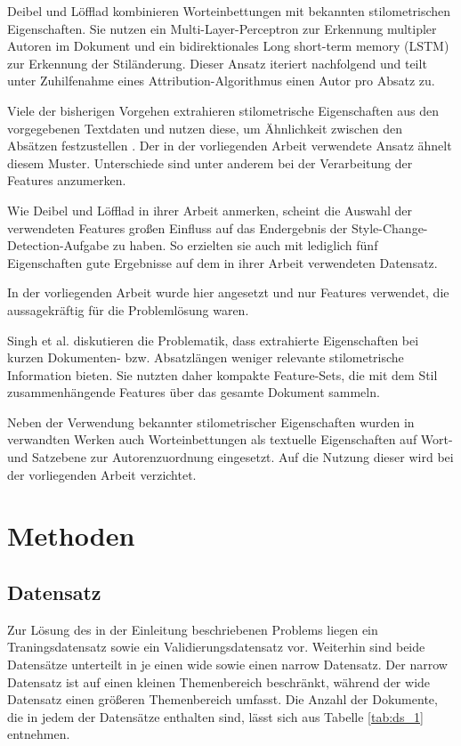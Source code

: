 \documentclass[conference]{IEEEtran}
\begin{document}
Deibel und Löfflad \cite{vw_b4} kombinieren Worteinbettungen mit bekannten stilometrischen Eigenschaften. Sie nutzen ein Multi-Layer-Perceptron zur Erkennung multipler Autoren im Dokument und ein bidirektionales Long short-term memory (LSTM) zur Erkennung der Stiländerung. Dieser Ansatz iteriert nachfolgend und teilt unter Zuhilfenahme eines Attribution-Algorithmus einen Autor pro Absatz zu.

Viele der bisherigen Vorgehen extrahieren stilometrische Eigenschaften aus den vorgegebenen Textdaten und nutzen diese, um Ähnlichkeit zwischen den Absätzen festzustellen \cite{vw_b5,vw_b6,vw_b7}. Der in der vorliegenden Arbeit verwendete Ansatz ähnelt diesem Muster. Unterschiede sind unter anderem bei der Verarbeitung der Features anzumerken. 

Wie Deibel und Löfflad \cite{vw_b4} in ihrer Arbeit anmerken, scheint die Auswahl der verwendeten Features großen Einfluss auf das Endergebnis der Style-Change-Detection-Aufgabe zu haben. So erzielten sie auch mit lediglich fünf Eigenschaften gute Ergebnisse auf dem in ihrer Arbeit verwendeten Datensatz.  

In der vorliegenden Arbeit wurde hier angesetzt und nur Features verwendet, die aussagekräftig für die Problemlösung waren. 

Singh et al. \cite{vw_b8} diskutieren die Problematik, dass extrahierte Eigenschaften bei kurzen Dokumenten- bzw. Absatzlängen weniger relevante stilometrische Information bieten. Sie nutzten daher kompakte Feature-Sets, die mit dem Stil zusammenhängende Features über das gesamte Dokument sammeln.
  

Neben der Verwendung bekannter stilometrischer Eigenschaften wurden in verwandten Werken auch Worteinbettungen als textuelle Eigenschaften auf Wort- \cite{vw_b9} und Satzebene \cite{vw_b2} zur Autorenzuordnung eingesetzt. Auf die Nutzung dieser wird bei der vorliegenden Arbeit verzichtet.


\section{Methoden}
	\subsection{Datensatz}
		Zur Lösung des in der Einleitung beschriebenen Problems liegen ein Traningsdatensatz sowie ein Validierungsdatensatz vor. Weiterhin sind beide Datensätze unterteilt in je einen wide sowie einen narrow Datensatz. Der narrow Datensatz ist auf einen kleinen Themenbereich beschränkt, während der wide Datensatz einen größeren Themenbereich umfasst. Die Anzahl der Dokumente, die in jedem der Datensätze enthalten sind, lässt sich aus Tabelle \ref{tab:ds_1} entnehmen.
		
\end{document}
